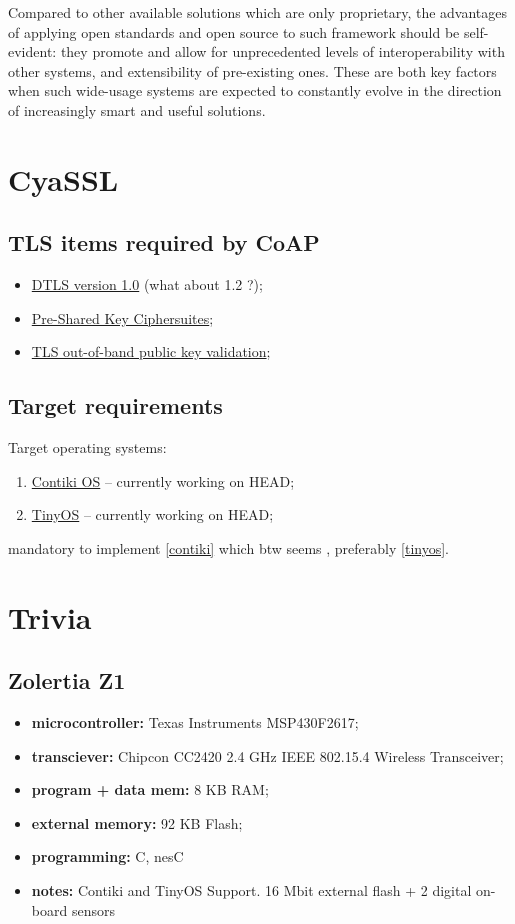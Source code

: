 \documentclass[10pt]{article}
\begin{document}
Compared to other available solutions which are only proprietary, the advantages of applying open standards and open source to such framework should be self-evident: they promote and allow for unprecedented levels of interoperability with other systems, and extensibility of pre-existing ones. These are both key factors when such wide-usage systems are expected to constantly evolve in the direction of increasingly smart and useful solutions.


\section{CyaSSL}

\subsection{TLS items required by CoAP}
\begin{itemize}
\item \href{http://tools.ietf.org/html/rfc4347}{DTLS version 1.0} (what about 1.2 ?);
\item \href{http://tools.ietf.org/html/rfc4279}{Pre-Shared Key Ciphersuites};
\item \href{http://tools.ietf.org/html/draft-wouters-tls-oob-pubkey}{TLS out-of-band public key validation};
\end{itemize}

\subsection{Target requirements}
Target operating systems:
\begin{enumerate}
\item\label{contiki} \href{http://www.contiki-os.org}{Contiki OS} -- currently working on HEAD;
\item\label{tinyos} \href{http://www.tinyos.net}{TinyOS} -- currently working on HEAD;
\end{enumerate}

mandatory to implement \ref{contiki} which btw seems , preferably \ref{tinyos}.  

\section{Trivia}

\subsection{Zolertia Z1}
\begin{itemize}
  \item \textbf{microcontroller:} Texas Instruments MSP430F2617;
  \item \textbf{transciever:} Chipcon CC2420 2.4 GHz IEEE 802.15.4 Wireless Transceiver;
  \item \textbf{program + data mem:} 8 KB RAM;
  \item \textbf{external memory:} 92 KB Flash;
  \item \textbf{programming:} C, nesC
  \item \textbf{notes:} Contiki and TinyOS Support. 16 Mbit external flash + 2 digital on-board sensors
\end{itemize}
\end{document}
